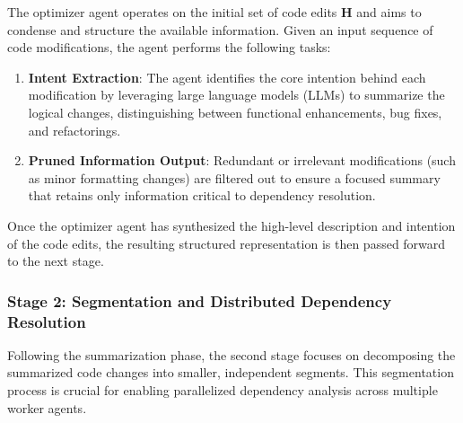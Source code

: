 

The optimizer agent operates on the initial set of code edits \( \mathbf{H} \) and aims to condense and structure the available information. Given an input sequence of code modifications, the agent performs the following tasks:

\begin{enumerate}
    \item \textbf{Intent Extraction}: The agent identifies the core intention behind each modification by leveraging large language models (LLMs) to summarize the logical changes, distinguishing between functional enhancements, bug fixes, and refactorings.
    \item \textbf{Pruned Information Output}: Redundant or irrelevant modifications (such as minor formatting changes) are filtered out to ensure a focused summary that retains only information critical to dependency resolution.
\end{enumerate}

Once the optimizer agent has synthesized the high-level description and intention of the code edits, the resulting structured representation is then passed forward to the next stage.

\subsubsection{Stage 2: Segmentation and Distributed Dependency Resolution}

Following the summarization phase, the second stage focuses on decomposing the summarized code changes into smaller, independent segments. This segmentation process is crucial for enabling parallelized dependency analysis across multiple worker agents.

